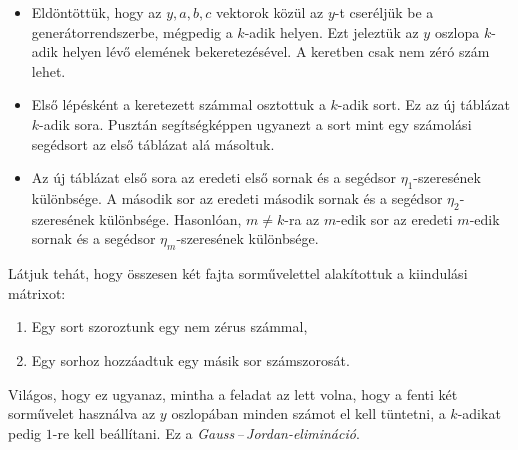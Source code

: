 \documentclass[a4paper, showtrims]{memoir}
\theoremstyle{plain}
\theoremstyle{remark}
\theoremstyle{definition}
\begin{document}
\begin{itemize}
	\item
	      Eldöntöttük, hogy az $y,a,b,c$ vektorok közül az $y$-t cseréljük be a generátorrendszerbe,
	      mégpedig a $k$-adik helyen.
	      Ezt jeleztük az $y$ oszlopa $k$-adik helyen lévő elemének bekeretezésével.
	      A keretben csak nem zéró szám lehet.
	\item
	      Első lépésként a keretezett számmal osztottuk a $k$-adik sort. Ez az új táblázat $k$-adik sora.
          Pusztán segítségképpen ugyanezt a sort mint egy számolási segédsort az első táblázat alá másoltuk.
	\item
	      Az új táblázat első sora az eredeti első sornak és a segédsor $\eta_1$-szeresének különbsége.
	      A második sor az eredeti második sornak és a segédsor $\eta_2$-szeresének különbsége.
	      Hasonlóan, $m\neq k$-ra az $m$-edik sor az eredeti $m$-edik sornak és a segédsor $\eta_m$-szeresének különbsége.
\end{itemize}

Látjuk tehát, hogy összesen két fajta sorművelettel alakítottuk a kiindulási mátrixot:
\begin{enumerate}
	\item Egy sort szoroztunk egy nem zérus számmal,
	\item Egy sorhoz hozzáadtuk egy másik sor számszorosát.
\end{enumerate}
Világos, hogy ez ugyanaz, mintha a feladat az lett volna,
hogy a fenti két sorművelet használva az $y$ oszlopában minden számot el kell tüntetni,
a $k$-adikat pedig $1$-re kell beállítani.
Ez a \emph{Gauss\,--\,Jordan-elimináció}.
\end{document}
